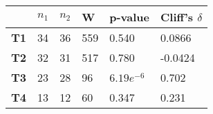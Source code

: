 \begin{tabular}{llllll}
    \hline
                & \textbf{$n_1$} & \textbf{$n_2$} & \textbf{W} & \textbf{p-value} & \textbf{Cliff's $\delta$} \\
    \hline
    \textbf{T1} & 34             & 36             & 559        & 0.540            & 0.0866                   \\
    \textbf{T2} & 32             & 31             & 517        & 0.780            & -0.0424                  \\
    \textbf{T3} & 23             & 28             & 96         & $6.19e^{-6}$     & 0.702                    \\
    \textbf{T4} & 13             & 12             & 60         & 0.347            & 0.231                    \\
    \hline
\end{tabular}